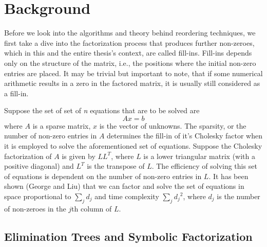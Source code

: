 \chapter{Background}
\label{ch:background}



Before we look into the algorithms and theory behind reordering techniques, we first take a dive into the factorization process that produces further non-zeroes, which in this and the entire thesis's context, are called fill-ins. Fill-ins depends only on the structure of the matrix, i.e., the positions where the initial non-zero entries are placed. It may be trivial but important to note, that if some numerical arithmetic results in a zero in the factored matrix, it is usually still considered as a fill-in. 

Suppose the set of set of \textit{n} equations that are to be solved are
\begin{equation}
    Ax = b
\end{equation}
where \(A\) is a sparse matrix, \(x\) is the vector of unknowns. The sparsity, or the number of non-zero entries in \(A\) determines the fill-in of it's Cholesky factor when it is employed to solve the aforementioned set of equations. 
Suppose the Cholesky factorization of \(A\) is given by \(LL^T\), where \(L\) is a lower triangular matrix (with a positive diagonal) and \(L^T\) is the transpose of \(L\). The efficiency of solving this set of equations is dependent on the number of non-zero entries in \(L\). It has been shown (George and Liu) that we can factor and solve the set of equations in space proportional to  \(\sum_j d_j\) and time complexity \(\sum_j {d_j}^2\), where \(d_j\) is the number of non-zeroes in the \(j\)th column of \(L\).


\section{Elimination Trees and Symbolic Factorization}
\label{sec:elim_tree}

